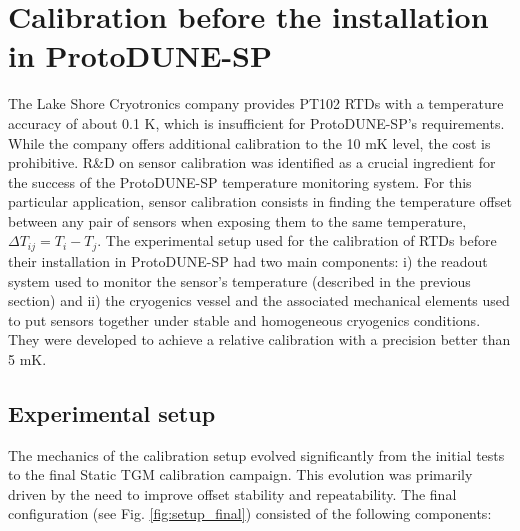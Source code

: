 \section{Calibration before the installation in ProtoDUNE-SP}
\label{sec:old_calib}

\noindent The Lake Shore Cryotronics company provides PT102 RTDs with a temperature accuracy of about 0.1 K, which is insufficient for ProtoDUNE-SP's requirements. While the company offers additional calibration to the 10 mK level, the cost is prohibitive. R\&D on sensor calibration was identified as a crucial ingredient for the success of the ProtoDUNE-SP temperature monitoring system. For this particular application, sensor calibration consists in finding the temperature offset between any pair of sensors when exposing them to the same temperature, $\Delta T_{ij}=T_{i}-T_{j}$. The experimental setup used for the calibration of RTDs before their installation in ProtoDUNE-SP had two main components: i) the readout system used to monitor the sensor's temperature (described in the previous section) and ii) the cryogenics vessel and the associated mechanical elements used to put sensors together under stable and homogeneous cryogenics conditions. They were developed to achieve a relative calibration with a precision better than 5 mK. %

\subsection{Experimental setup}
\noindent The mechanics of the calibration setup evolved significantly from the initial tests to the final Static TGM  calibration campaign. This evolution was primarily driven by the need to improve offset stability and repeatability. The final configuration (see Fig. \ref{fig:setup_final}) consisted of the following components:

